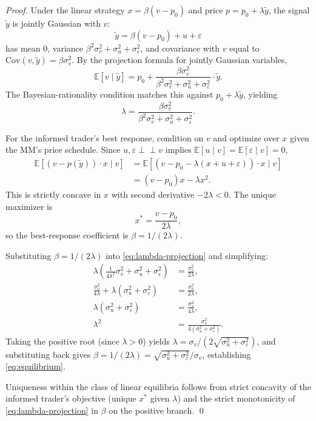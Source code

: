 \documentclass[runningheads]{llncs}
\newcommand{\E}{\mathbb{E}}
\newcommand{\Cov}{\mathrm{Cov}}
\newcommand{\indep}{\perp\!\!\!\perp}
\newcommand{\sigv}{\sigma_v}
\newcommand{\sigu}{\sigma_u}
\newcommand{\sige}{\sigma_\varepsilon}
\newcommand{\ytil}{\tilde y}
\begin{document}
\begin{proof}
Under the linear strategy $x = \beta(v - p_0)$ and price
$p = p_0 + \lambda \ytil$, the signal $\ytil$ is jointly Gaussian
with $v$:
\[
\ytil = \beta(v - p_0) + u + \varepsilon
\]
has mean $0$, variance $\beta^2 \sigv^2 + \sigu^2 + \sige^2$, and
covariance with $v$ equal to $\Cov(v, \ytil) = \beta \sigv^2$. By
the projection formula for jointly Gaussian variables,
\begin{equation}
\E[v \mid \ytil] = p_0 + \frac{\beta \sigv^2}
{\beta^2 \sigv^2 + \sigu^2 + \sige^2} \cdot \ytil.
\label{eq:projection}
\end{equation}
The Bayesian-rationality condition matches this against $p_0 +
\lambda \ytil$, yielding
\begin{equation}
\lambda = \frac{\beta \sigv^2}{\beta^2 \sigv^2 + \sigu^2 + \sige^2}.
\label{eq:lambda-projection}
\end{equation}

For the informed trader's best response, condition on $v$ and
optimize over $x$ given the MM's price schedule. Since
$u, \varepsilon \indep v$ implies
$\E[u \mid v] = \E[\varepsilon \mid v] = 0$,
\begin{align*}
\E[(v - p(\ytil)) \cdot x \mid v]
&= \E[(v - p_0 - \lambda(x + u + \varepsilon)) \cdot x \mid v] \\
&= (v - p_0) x - \lambda x^2.
\end{align*}
This is strictly concave in $x$ with second derivative $-2\lambda
< 0$. The unique maximizer is
\[
x^* = \frac{v - p_0}{2\lambda},
\]
so the best-response coefficient is $\beta = 1/(2\lambda)$.

Substituting $\beta = 1/(2\lambda)$ into
\eqref{eq:lambda-projection} and simplifying:
\begin{align*}
\lambda\left( \tfrac{1}{4\lambda^2} \sigv^2 + \sigu^2 + \sige^2 \right)
&= \frac{\sigv^2}{2\lambda}, \\
\frac{\sigv^2}{4\lambda} + \lambda(\sigu^2 + \sige^2)
&= \frac{\sigv^2}{2\lambda}, \\
\lambda(\sigu^2 + \sige^2)
&= \frac{\sigv^2}{4\lambda}, \\
\lambda^2 &= \frac{\sigv^2}{4(\sigu^2 + \sige^2)}.
\end{align*}
Taking the positive root (since $\lambda > 0$) yields $\lambda =
\sigv / (2\sqrt{\sigu^2 + \sige^2})$, and substituting back gives
$\beta = 1/(2\lambda) = \sqrt{\sigu^2 + \sige^2}/\sigv$,
establishing \eqref{eq:equilibrium}.

Uniqueness within the class of linear equilibria follows from
strict concavity of the informed trader's objective (unique
$x^*$ given $\lambda$) and the strict monotonicity of
\eqref{eq:lambda-projection} in $\beta$ on the positive branch.
\qed
\end{proof}
\end{document}
